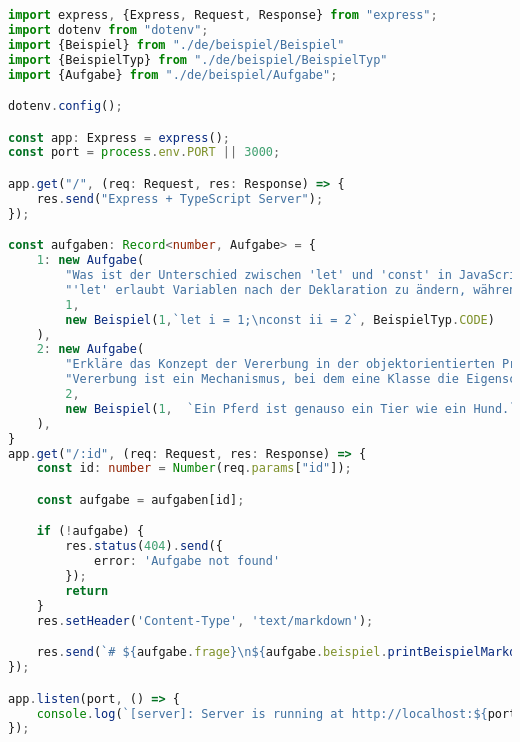 \documentclass[./einleitung.tex]{subfiles}
\begin{document}
    \begin{lstlisting}[language=Typescript, caption=index.ts, label=lst:indexTs]
import express, {Express, Request, Response} from "express";
import dotenv from "dotenv";
import {Beispiel} from "./de/beispiel/Beispiel"
import {BeispielTyp} from "./de/beispiel/BeispielTyp"
import {Aufgabe} from "./de/beispiel/Aufgabe";

dotenv.config();

const app: Express = express();
const port = process.env.PORT || 3000;

app.get("/", (req: Request, res: Response) => {
    res.send("Express + TypeScript Server");
});

const aufgaben: Record<number, Aufgabe> = {
    1: new Aufgabe(
        "Was ist der Unterschied zwischen 'let' und 'const' in JavaScript?",
        "'let' erlaubt Variablen nach der Deklaration zu ändern, während 'const' nur eine einmalige Zuweisung erlaubt. Der Wert einer 'const' Variable kann nicht geändert werden, aber die Eigenschaften eines Objekts oder Arrays, das mit 'const' deklariert wurde, können geändert werden.",
        1,
        new Beispiel(1,`let i = 1;\nconst ii = 2`, BeispielTyp.CODE)
    ),
    2: new Aufgabe(
        "Erkläre das Konzept der Vererbung in der objektorientierten Programmierung.",
        "Vererbung ist ein Mechanismus, bei dem eine Klasse die Eigenschaften und Methoden einer anderen Klasse erben kann. Die Klasse, die erbt, wird als abgeleitete Klasse oder Unterklasse bezeichnet, während die Klasse, von der geerbt wird, als Basisklasse oder Oberklasse bezeichnet wird. Durch Vererbung können gemeinsame Eigenschaften und Verhalten wiederverwendet werden.",
        2,
        new Beispiel(1,  `Ein Pferd ist genauso ein Tier wie ein Hund.`, BeispielTyp.TEXT)
    ),
}
app.get("/:id", (req: Request, res: Response) => {
    const id: number = Number(req.params["id"]);

    const aufgabe = aufgaben[id];

    if (!aufgabe) {
        res.status(404).send({
            error: 'Aufgabe not found'
        });
        return
    }
    res.setHeader('Content-Type', 'text/markdown');

    res.send(`# ${aufgabe.frage}\n${aufgabe.beispiel.printBeispielMarkdown()}`);
});

app.listen(port, () => {
    console.log(`[server]: Server is running at http://localhost:${port}`);
});
    \end{lstlisting}
\end{document}
